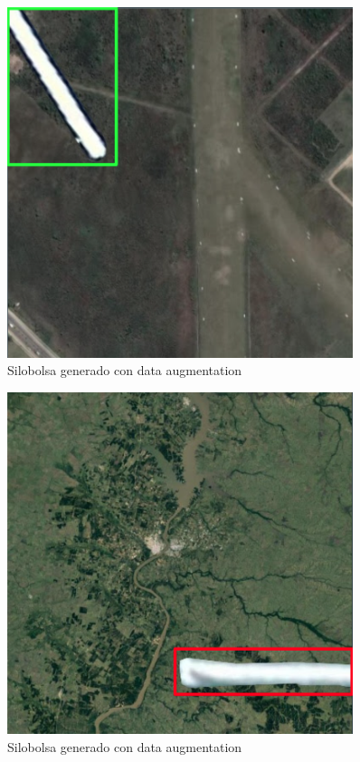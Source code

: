 \begin{figure}
    \centering
    \includegraphics[width=0.9\textwidth]{img/silobolsa data aug - 1.png}
    \caption{Silobolsa generado con data augmentation}
    \label{Silobolsa generado con data augmentation 1}
\end{figure}

\begin{figure}
    \centering
    \includegraphics[width=0.9\textwidth]{img/silobolsa data aug - 2.png}
    \caption{Silobolsa generado con data augmentation}
    \label{Silobolsa generado con data augmentation 2}
\end{figure}
